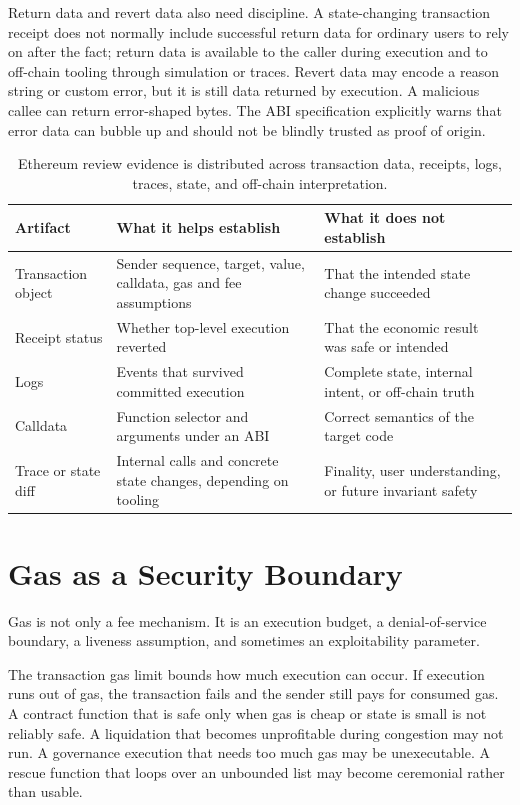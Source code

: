 Return data and revert data also need discipline. A state-changing transaction receipt does not normally include successful return data for ordinary users to rely on after the fact; return data is available to the caller during execution and to off-chain tooling through simulation or traces. Revert data may encode a reason string or custom error, but it is still data returned by execution. A malicious callee can return error-shaped bytes. The ABI specification explicitly warns that error data can bubble up and should not be blindly trusted as proof of origin.

\begin{table}[htbp]
\centering
\small
\renewcommand{\arraystretch}{1.18}
\begin{tabularx}{\textwidth}{@{}>{\RaggedRight\arraybackslash}p{}>{\RaggedRight\arraybackslash}p{}X@{}}
\toprule
Artifact & What it helps establish & What it does not establish \\
\midrule
Transaction object & Sender sequence, target, value, calldata, gas and fee assumptions & That the intended state change succeeded \\
Receipt status & Whether top-level execution reverted & That the economic result was safe or intended \\
Logs & Events that survived committed execution & Complete state, internal intent, or off-chain truth \\
Calldata & Function selector and arguments under an ABI & Correct semantics of the target code \\
Trace or state diff & Internal calls and concrete state changes, depending on tooling & Finality, user understanding, or future invariant safety \\
\bottomrule
\end{tabularx}
\caption{Ethereum review evidence is distributed across transaction data, receipts, logs, traces, state, and off-chain interpretation.}
\end{table}

\section{Gas as a Security Boundary}

Gas is not only a fee mechanism. It is an execution budget, a denial-of-service boundary, a liveness assumption, and sometimes an exploitability parameter.

The transaction gas limit bounds how much execution can occur. If execution runs out of gas, the transaction fails and the sender still pays for consumed gas. A contract function that is safe only when gas is cheap or state is small is not reliably safe. A liquidation that becomes unprofitable during congestion may not run. A governance execution that needs too much gas may be unexecutable. A rescue function that loops over an unbounded list may become ceremonial rather than usable.

